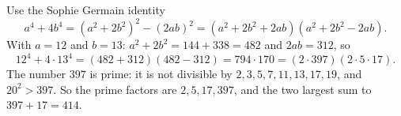 Use the Sophie Germain identity
\[
a^4+4b^4=(a^2+2b^2)^2-(2ab)^2=(a^2+2b^2+2ab)(a^2+2b^2-2ab).
\]
With $a=12$ and $b=13$: $a^2+2b^2=144+338=482$ and $2ab=312$, so
\[
12^4+4\cdot13^4=(482+312)(482-312)=794\cdot170=(2\cdot397)(2\cdot5\cdot17).
\]
The number $397$ is prime: it is not divisible by $2,3,5,7,11,13,17,19$, and $20^2>397$. So the prime factors are $2,5,17,397$, and the two largest sum to $397+17=\boxed{414}$.
